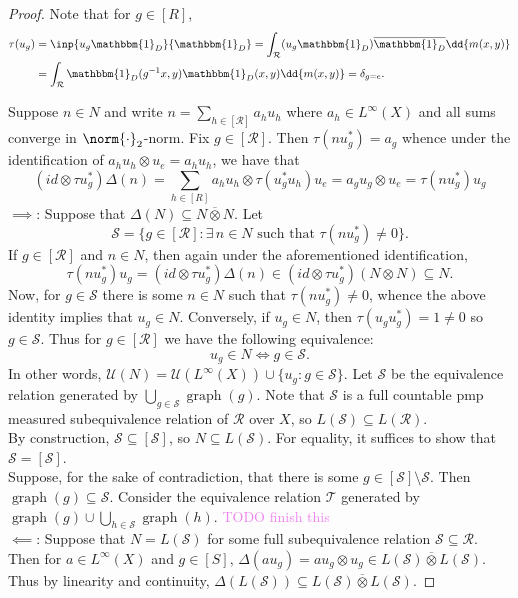 \documentclass[12pt,letterpaper]{article}
\newcommand{\sub}{\subseteq}
\DeclareMathOperator{\graph}{graph}
\newcommand*\cls[1]{\overline{#1}}
\newcommand{\ind}{\mathbbm{1}}
\theoremstyle{definition}
\theoremstyle{plain}
\theoremstyle{remark}
\begin{document}
\begin{proof}
    Note that for $ g\in [R] $,
    \begin{align*}
        \tau(u_{g}) &= \inp{u_{g}\ind_{D}}{\ind_{D}} = \int_{\mathcal{R}} (u_{g}\ind_{D})\cls{\ind_{D}} \dd{m(x,y)}\\
        &=\int_{\mathcal{R}} \ind_{D}(g^{-1}x,y)\ind_{D}(x,y) \dd{m(x,y)} = \delta_{g=e}.
    \end{align*}

    Suppose $ n\in N $ and write $ n = \sum_{h\in[\mathcal{R}]}a_{h}u_{h} $ where $ a_{h}\in L^{\infty}(X) $ and all sums converge in $ \norm{\cdot}_{2} $-norm. Fix $ g\in [\mathcal{R}] $. Then $ \tau(nu_{g}^{*}) = a_{g} $ whence under the identification of $ a_{h}u_{h}\otimes u_{e} = a_{h}u_{h} $, we have that
    \[
        (id \otimes \tau u_{g}^{*}) \Delta(n) = \sum_{h\in [R]}a_{h}u_{h} \otimes \tau(u_{g}^{*}u_{h})u_{e} = a_{g}u_{g} \otimes u_{e} = \tau(nu_{g}^{*})u_{g}
    \]
    \underline{$ \implies $}: Suppose that $ \Delta(N)\sub N \cls{\otimes} N $. Let 
    \[
        \mathscr{S} = \{g\in [\mathcal{R}]: \exists\, n\in N \text{ such that } \tau(nu_{g}^{*}) \neq 0\}.
    \]
    If $ g\in [\mathcal{R}] $ and $ n\in N $, then again under the aforementioned identification,
    \[
       \tau(nu_{g}^{*} )u_{g} = (id \otimes \tau u_{g}^{*}) \Delta(n) \in (id \otimes \tau u_{g}^{*})(N \otimes N) \sub N.
    \]
    Now, for $ g\in \mathscr{S} $ there is some $ n\in N $ such that $ \tau(nu_{g}^{*})\neq 0 $, whence the above identity implies that $ u_{g}\in N $. Conversely, if $ u_{g}\in N $, then $ \tau(u_{g}u_{g}^{*}) = 1 \neq 0 $ so $ g\in \mathscr{S} $. Thus for $ g\in[\mathcal{R}] $ we have the following equivalence:
    \[
        u_{g}\in N \iff g\in \mathscr{S}.
    \]
    In other words, $ \mathcal{U}(N) = \mathcal{U}(L^{\infty}(X))\cup \{u_{g}: g\in \mathscr{S}\} $.
    Let $ \mathcal{S} $ be the equivalence relation generated by $ \bigcup_{g\in \mathscr{S}} \graph(g) $. Note that $ \mathcal{S} $ is a full countable pmp measured subequivalence relation of $ \mathcal{R} $ over $ X $, so $ L(\mathcal{S})\sub L(\mathcal{R}) $.\\

    By construction, $ \mathscr{S} \sub [\mathcal{S}] $, so $ N\sub L(\mathcal{S}) $. For equality, it suffices to show that $ \mathscr{S} = [\mathcal{S}] $. \\

    Suppose, for the sake of contradiction, that there is some $ g\in [\mathcal{S}]\setminus \mathscr{S} $. Then $ \graph(g)\sub \mathcal{S} $. Consider the equivalence relation $ \mathcal{T} $ generated by $ \graph(g)\cup\bigcup_{h\in \mathscr{S}}\graph(h) $. \textcolor{violet}{TODO finish this}\\


    \underline{$ \impliedby $}: Suppose that $ N = L(\mathcal{S}) $ for some full subequivalence relation $ \mathcal{S}\sub \mathcal{R} $. Then for $ a\in L^{\infty}(X) $ and $ g\in [S] $, $ \Delta (au_{g}) = au_{g} \otimes u_{g}\in L(\mathcal{S}) \cls{\otimes }L(\mathcal{S}) $. Thus by linearity and continuity, $ \Delta (L(\mathcal{S}))\sub L(\mathcal{S}) \cls{\otimes }L(\mathcal{S}) $.
    
\end{proof}
\end{document}
